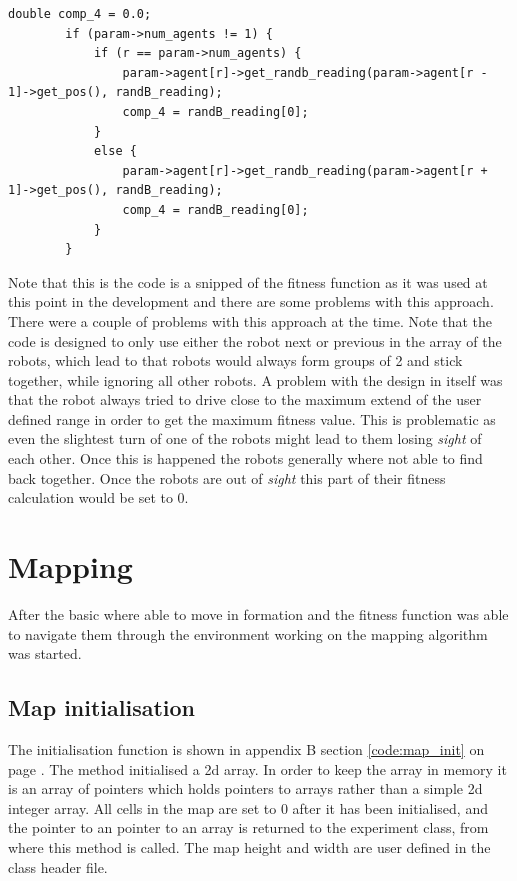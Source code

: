 \begin{lstlisting}[caption = {Fitness Function Calculation to Consider the Distance Between 2 Robots}]
  double comp_4 = 0.0;
        if (param->num_agents != 1) {
            if (r == param->num_agents) {
                param->agent[r]->get_randb_reading(param->agent[r - 1]->get_pos(), randB_reading);
                comp_4 = randB_reading[0];
            }
            else {
                param->agent[r]->get_randb_reading(param->agent[r + 1]->get_pos(), randB_reading);
                comp_4 = randB_reading[0];
            }
        }
\end{lstlisting}\label{chap3:comp4_code}

Note that this is the code is a snipped of the fitness function as it was used at this point in the development and there are some problems with this approach. 
There were a couple of problems with this approach at the time. Note that the code is designed to only use either the robot next or previous in the array of the robots, which lead to that robots would always form groups of 2 and stick together, while ignoring all other robots.
A problem with the design in itself was that the robot always tried to drive close to the maximum extend of the user defined range in order to get the maximum fitness value. This is problematic as even the slightest turn of one of the robots might lead to them losing \textit{sight} of each other. Once this is happened the robots generally where not able to find back together. Once the robots are out of \textit{sight} this part of their fitness calculation would be set to 0. \\

\section{Mapping}
After the basic where able to move in formation and the fitness function was able to navigate them through the environment working on the mapping algorithm was started. \\
\subsection{Map initialisation}
\label{chap3:map_init}
The initialisation function is shown in appendix B section \ref{code:map_init} on page \pageref{code:map_init}. 
The method initialised a 2d array. In order to keep the array in memory it is an array of pointers which holds pointers to arrays rather than a simple 2d integer array.
All cells in the map are set to 0 after it has been initialised, and the pointer to an pointer to an array is returned to the experiment class, from where this method is called.
The map height and width are user defined in the class header file.

